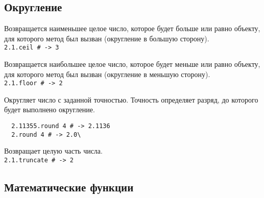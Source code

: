 \subsection*{Округление}

\begin{methodlist}
  Возвращается наименьшее целое число, которое будет больше или равно объекту, для которого метод был вызван (округление в большую сторону).
  \\\verb!2.1.ceil # -> 3!

  Возвращается наибольшее целое число, которое будет меньше или равно объекту, для которого метод был вызван (округление в меньшую сторону).
  \\\verb!2.1.floor # -> 2!

  Округляет число с заданной точностью. Точность определяет разряд, до которого будет выполнено округление.
  \begin{verbatim}
  2.11355.round 4 # -> 2.1136
  2.round 4 # -> 2.0\
  \end{verbatim} 

  Возвращает целую часть числа.
  \\\verb!2.1.truncate # -> 2!
\end{methodlist}

\subsection*{Математические функции}

